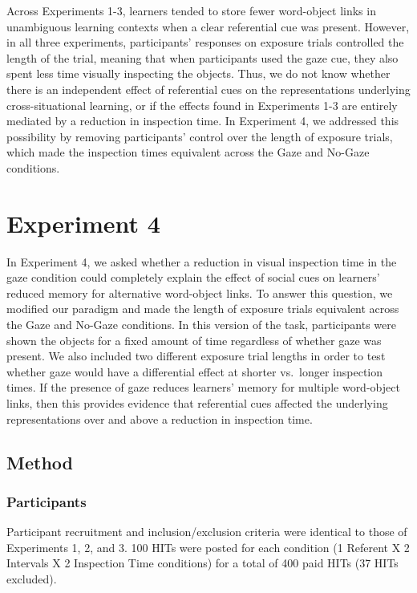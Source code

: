 \documentclass[oneside]{report}
\begin{document}
Across Experiments 1-3, learners tended to store fewer word-object links
in unambiguous learning contexts when a clear referential cue was
present. However, in all three experiments, participants' responses on
exposure trials controlled the length of the trial, meaning that when
participants used the gaze cue, they also spent less time visually
inspecting the objects. Thus, we do not know whether there is an
independent effect of referential cues on the representations underlying
cross-situational learning, or if the effects found in Experiments 1-3
are entirely mediated by a reduction in inspection time. In Experiment
4, we addressed this possibility by removing participants' control over
the length of exposure trials, which made the inspection times
equivalent across the Gaze and No-Gaze conditions.

\section{Experiment 4}\label{experiment-4}

In Experiment 4, we asked whether a reduction in visual inspection time
in the gaze condition could completely explain the effect of social cues
on learners' reduced memory for alternative word-object links. To answer
this question, we modified our paradigm and made the length of exposure
trials equivalent across the Gaze and No-Gaze conditions. In this
version of the task, participants were shown the objects for a fixed
amount of time regardless of whether gaze was present. We also included
two different exposure trial lengths in order to test whether gaze would
have a differential effect at shorter vs.~longer inspection times. If
the presence of gaze reduces learners' memory for multiple word-object
links, then this provides evidence that referential cues affected the
underlying representations over and above a reduction in inspection
time.

\subsection{Method}\label{method-3}

\subsubsection{Participants}\label{participants-5}

Participant recruitment and inclusion/exclusion criteria were identical
to those of Experiments 1, 2, and 3. 100 HITs were posted for each
condition (1 Referent X 2 Intervals X 2 Inspection Time conditions) for
a total of 400 paid HITs (37 HITs excluded).
\end{document}
